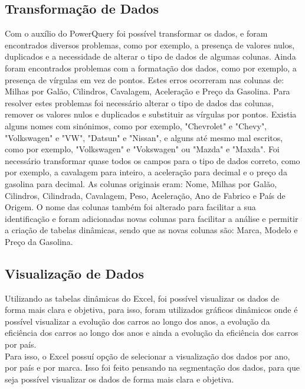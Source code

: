 \documentclass[a4paper]{article}
\begin{document}
\subsection{Transformação de Dados}
Com o auxílio do PowerQuery foi possível transformar os dados, e foram encontrados diversos problemas,
como por exemplo, a presença de valores nulos, duplicados e a necessidade de alterar o tipo de dados de algumas colunas.
Ainda foram encontrados problemas com a formatação dos dados, como por exemplo, a presença de vírgulas em vez de pontos. 
Estes erros ocorreram nas colunas de: Milhas por Galão, Cilindros, Cavalagem, Aceleração e Preço da Gasolina.
Para resolver estes problemas foi necessário alterar o tipo de dados das colunas, remover os valores nulos e duplicados e substituir as vírgulas por pontos.
Existia alguns nomes com sinónimos, como por exemplo, "Chevrolet" e "Chevy", "Volkswagen" e "VW", "Datsun" e "Nissan", e alguns até mesmo mal escritos, 
como por exemplo, "Volkswagen" e "Vokswagen" ou "Mazda" e "Maxda".
Foi necessário transformar quase todos os campos para o tipo de dados correto, como por exemplo, a cavalagem para inteiro, 
a aceleração para decimal e o preço da gasolina para decimal.
As colunas originais eram: Nome, Milhas por Galão, Cilindros, Cilindrada, Cavalagem, Peso, Aceleração, Ano de Fabrico e País de Origem.
O nome das colunas também foi alterado para facilitar a sua identificação e foram adicionadas novas colunas para facilitar a análise
e permitir a criação de tabelas dinâmicas, sendo que as novas colunas são: Marca, Modelo e Preço da Gasolina.

\subsection{Visualização de Dados}
Utilizando as tabelas dinâmicas do Excel, foi possível visualizar os dados de forma mais clara e objetiva,
para isso, foram utilizados gráficos dinâmicos onde é possível visualizar a evolução dos carros ao longo dos anos,
a evolução da eficiência dos carros ao longo dos anos e ainda a evolução da eficiência dos carros por país.
\\
Para isso, o Excel possuí opção de selecionar a visualização dos dados por ano, por país e por marca.
Isso foi feito pensando na segmentação dos dados, para que seja possível visualizar os dados de forma mais clara e objetiva.

\end{document}
